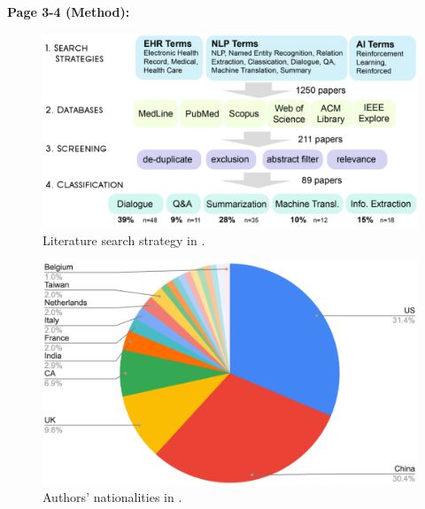     \textbf{Page 3-4 (Method):}
    \begin{figure}[H]
        \centering
        \includegraphics[width=1\textwidth]{figures/0022_SR06US23/fig2.png}
        \caption{Literature search strategy in \cite{x090}.}
        \label{fig2:0022_SR06US23}
    \end{figure}
    \begin{figure}[H]
        \centering
        \includegraphics[width=1\textwidth]{figures/0022_SR06US23/fig3.png}
        \caption{Authors' nationalities in \cite{x090}.}
        \label{fig3:0022_SR06US23}
    \end{figure}
    
